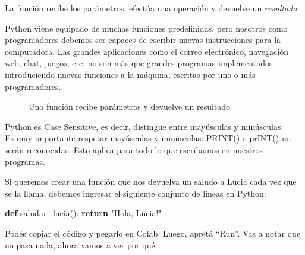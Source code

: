 \documentclass[
  letterpaper,
  DIV=11,
  numbers=noendperiod]{scrreprt}
\makeatletter
\newenvironment{Shaded}{\begin{snugshade}}{\end{snugshade}}
\newcommand{\ControlFlowTok}[1]{\textcolor[rgb]{0.00,0.23,0.31}{\textbf{#1}}}
\newcommand{\KeywordTok}[1]{\textcolor[rgb]{0.00,0.23,0.31}{\textbf{#1}}}
\newcommand{\NormalTok}[1]{\textcolor[rgb]{0.00,0.23,0.31}{#1}}
\newcommand{\StringTok}[1]{\textcolor[rgb]{0.13,0.47,0.30}{#1}}
\newcommand*\pandocbounded[1]{%
  \sbox\pandoc@box{#1}%
  \Gscale@div\@tempa{\textheight}{\dimexpr\ht\pandoc@box+\dp\pandoc@box\relax}%
  \Gscale@div\@tempb{\linewidth}{\wd\pandoc@box}%
  \ifdim\@tempb\p@<\@tempa\p@\let\@tempa\@tempb\fi%
  \ifdim\@tempa\p@<\p@\scalebox{\@tempa}{\usebox\pandoc@box}%
  \else\usebox{\pandoc@box}%
  \fi%
}
\makeatother
\begin{document}
La función recibe los parámetros, efectúa una operación y devuelve un
\emph{resultado}.

Python viene equipado de muchas funciones predefinidas, pero nosotros
como programadores debemos ser capaces de escribir nuevas instrucciones
para la computadora. Las grandes aplicaciones como el correo
electrónico, navegación web, chat, juegos, etc. no son más que grandes
programas implementados introduciendo nuevas funciones a la máquina,
escritas por uno o más programadores.

\begin{figure}[H]

{\centering \pandocbounded{\texttt{[image: ./imgs/unidad\_2/funcion.png]}}

}

\caption{Una función recibe parámetros y devuelve un resultado}

\end{figure}%

\begin{tcolorbox}[enhanced jigsaw, arc=.35mm, toptitle=1mm, colframe=quarto-callout-note-color-frame, bottomtitle=1mm, opacitybacktitle=0.6, colbacktitle=quarto-callout-note-color!10!white, leftrule=.75mm, coltitle=black, toprule=.15mm, titlerule=0mm, title=\textcolor{quarto-callout-note-color}{\faInfo}\hspace{0.5em}{Python es Case Sensitive}, bottomrule=.15mm, rightrule=.15mm, colback=white, breakable, opacityback=0, left=2mm]

Python es Case Sensitive, es decir, distingue entre mayúsculas y
minúsculas.\\
Es muy importante respetar mayúsculas y minúsculas: PRINT() o prINT() no
serán reconocidas. Esto aplica para todo lo que escribamos en nuestros
programas.

\end{tcolorbox}

Si queremos crear una función que nos devuelva un saludo a Lucia cada
vez que se la llama, debemos ingresar el siguiente conjunto de líneas en
Python:

\begin{Shaded}
\begin{Highlighting}[]
\KeywordTok{def}\NormalTok{ saludar\_lucia():}
  \ControlFlowTok{return} \StringTok{"Hola, Lucia!"}
\end{Highlighting}
\end{Shaded}

Podés copiar el código y pegarlo en Colab. Luego, apretá ``Run''. Vas a
notar que no pasa nada, ahora vamos a ver por qué.
\end{document}
